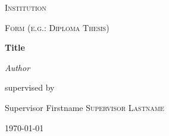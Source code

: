 \documentclass[12pt,a4paper]{report}
\begin{document}
\begin{titlepage}
	\centering
	{\scshape\LARGE Institution \par}
	\vspace{1cm}
	{\scshape\Large Form (e.g.: Diploma Thesis) \par}
	\vspace{1.5cm}
	{\huge\bfseries Title\par}
	\vspace{2cm}
	{\Large\itshape Author\par}
	\vfill
	supervised by\par
	Supervisor Firstname \textsc{Supervisor Lastname}

	\vfill

	{\large \today\par}
\end{titlepage}
\end{document}
